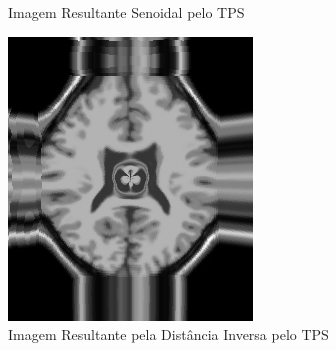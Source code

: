 \documentclass[]{spie}  %
\begin{document}
\begin{figure}[h]
\begin{subfigure}[t]{0.16\textwidth}
	  \caption{Imagem Resultante Senoidal pelo TPS}
	  \label{fig:sin-image-tps} 
	\end{subfigure}
	\begin{subfigure}[t]{0.16\textwidth}
	  \includegraphics[width=\textwidth]{../images/resultDist.png}
	  \caption{Imagem Resultante pela Distância Inversa pelo TPS}
	  \label{fig:dist-image-tps}
	\end{subfigure}
	\begin{subfigure}[t]{0.16\textwidth}

\end{subfigure}
\end{figure}
\end{document}
